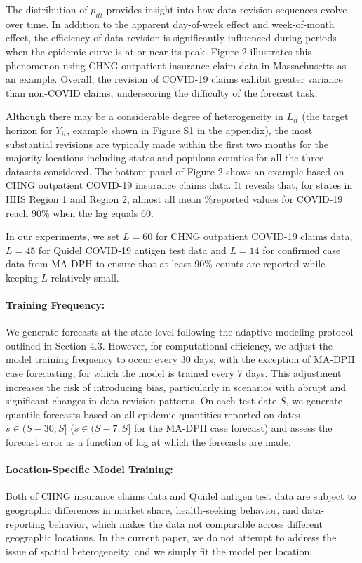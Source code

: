 The distribution of $p_{itl}$ provides insight into how data revision sequences evolve over time. In addition to the apparent day-of-week effect and week-of-month effect, the efficiency of data revision is significantly influenced during periods when the epidemic curve is at or near its peak. Figure 2 illustrates this phenomenon using CHNG outpatient insurance claim data in Massachusetts as an example. Overall, the revision of COVID-19 claims exhibit greater variance than non-COVID claims, underscoring the difficulty of the forecast task.

Although there may be a considerable degree of heterogeneity in $L_{it}$ (the target horizon for $Y_{it}$, example shown in Figure S1 in the appendix), the most substantial revisions are typically made within the first two months for the majority locations including states and populous counties for all the three datasets considered. The bottom panel of Figure 2 shows an example based on CHNG outpatient COVID-19 insurance claims data. It reveals that, for states in HHS Region 1 and Region 2, almost all mean \%reported values for COVID-19 reach 90\% when the lag equals 60.  

In our experiments, we set $L=60$ for CHNG outpatient COVID-19 claims data, $L=45$ for Quidel COVID-19 antigen test data and $L=14$ for confirmed case data from MA-DPH to ensure that at least 90\% counts are reported while keeping $L$ relatively small. 

\paragraph{Training Frequency:}
We generate forecasts at the state level following the adaptive modeling protocol outlined in Section 4.3. However, for computational efficiency, we adjust the model training frequency to occur every 30 days, with the exception of MA-DPH case forecasting, for which the model is trained every 7 days. This adjustment increases the risk of introducing bias, particularly in scenarios with abrupt and significant changes in data revision patterns. On each test date \( S \), we generate quantile forecasts based on all epidemic quantities reported on dates \( s \in (S-30, S] \) (\( s \in (S-7, S] \) for the MA-DPH case forecast) and assess the forecast error as a function of lag at which the forecasts are made.


\paragraph{Location-Specific Model Training:}
Both of CHNG insurance claims data and Quidel antigen test data are subject to geographic differences in market share, health-seeking behavior, and data-reporting behavior, which makes the data not comparable across different geographic locations. In the current paper, we do not attempt to address the issue of spatial heterogeneity, and we simply fit the model per location.








